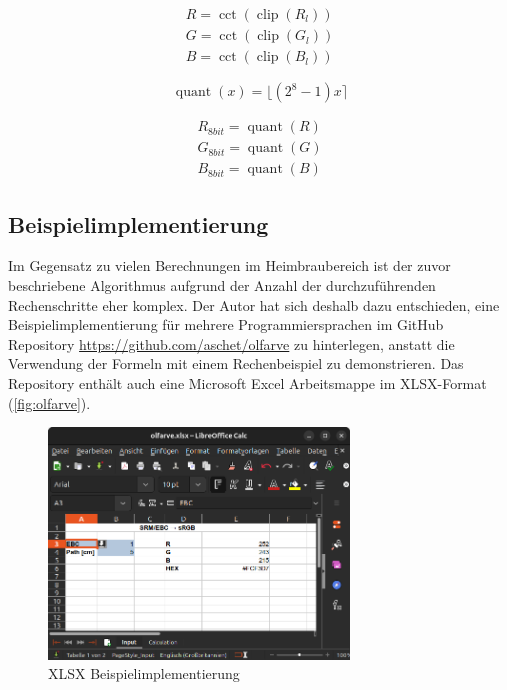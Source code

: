\documentclass[10pt,a4paper,DIV=12,parskip=half]{scrarticle}
\begin{document}
\begin{equation*}
\begin{gathered}
R = \operatorname{cct}(\operatorname{clip}(R_{l})) \\
G = \operatorname{cct}(\operatorname{clip}(G_{l})) \\
B = \operatorname{cct}(\operatorname{clip}(B_{l}))
\end{gathered}
\end{equation*}

\begin{equation*}
\operatorname{quant}(x) = \lfloor (2^8-1) x \rceil
\end{equation*}

\begin{equation*}
\begin{gathered}
R_{8bit} = \operatorname{quant}(R) \\
G_{8bit} = \operatorname{quant}(G) \\
B_{8bit} = \operatorname{quant}(B)
\end{gathered}
\end{equation*}

\subsection*{Beispielimplementierung}

Im Gegensatz zu vielen Berechnungen im Heimbraubereich ist der zuvor beschriebene Algorithmus aufgrund der Anzahl der durchzuführenden Rechenschritte eher komplex. Der Autor hat sich deshalb dazu entschieden, eine Beispielimplementierung für mehrere Programmiersprachen im GitHub Repository \url{https://github.com/aschet/olfarve} zu hinterlegen, anstatt die Verwendung der Formeln mit einem Rechenbeispiel zu demonstrieren. Das Repository enthält auch eine Microsoft Excel Arbeitsmappe im XLSX-Format (\autoref{fig:olfarve}).

\begin{figure}[H]
	\centering
	\includegraphics[width=8cm]{olfarve.png}
	\caption{XLSX Beispielimplementierung}
	\label{fig:olfarve}
\end{figure}
\end{document}
